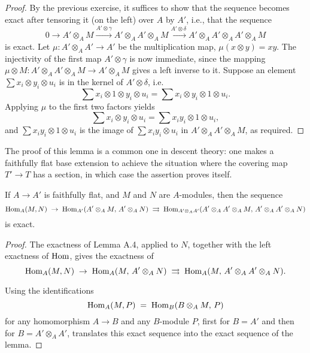 \documentclass[12pt]{article}
\begin{document}
\begin{proof}
    By the previous exercise, it suffices to show that the sequence becomes exact after tensoring it (on the left) over $A$ by $A'$, i.e., that the sequence
    \[
        0 \longrightarrow A' \otimes_A M \xrightarrow{A' \otimes \gamma} A' \otimes_A A' \otimes_A M \xrightarrow{A' \otimes \delta} A' \otimes_A A' \otimes_A A' \otimes_A M
    \]
    is exact. Let $\mu: A' \otimes_A A' \to A'$ be the multiplication map, $\mu(x \otimes y) = xy$. The injectivity of the first map $A' \otimes \gamma$ is now immediate, since the mapping $\mu \otimes M: A' \otimes_A A' \otimes_A M \to A' \otimes_A M$ gives a left inverse to it. Suppose an element $\sum x_i \otimes y_i \otimes u_i$ is in the kernel of $A' \otimes \delta$, i.e.
    \[
        \sum x_i \otimes 1 \otimes y_i \otimes u_i = \sum x_i \otimes y_i \otimes 1 \otimes u_i.
    \]
    Applying $\mu$ to the first two factors yields
    \[
        \sum x_i \otimes y_i \otimes u_i = \sum x_i y_i \otimes 1 \otimes u_i,
    \]
    and $\sum x_i y_i \otimes 1 \otimes u_i$ is the image of $\sum x_i y_i \otimes u_i$ in $A' \otimes_A A' \otimes_A M$, as required.
\end{proof}

\begin{remark}
    The proof of this lemma is a common one in descent theory: one makes a faithfully flat base extension to achieve the situation where the covering map \( T' \to T \) has a section, in which case the assertion proves itself.
\end{remark}

\begin{lemma}\label{lem:descent_hom}
If $A \to A'$ is faithfully flat, and $M$ and $N$ are $A$-modules, then the sequence
\[
\operatorname{Hom}_A(M,N) \;\to\; \operatorname{Hom}_{A'}(A' \otimes_A M,\, A' \otimes_A N) 
\;\rightrightarrows\; \operatorname{Hom}_{A' \otimes_A A'}(A' \otimes_A A' \otimes_A M,\, A' \otimes_A A' \otimes_A N)
\]
is exact.
\end{lemma}

\begin{proof}
The exactness of Lemma A.4, applied to $N$, together with the left exactness of $\operatorname{Hom}$, gives the exactness of
\[
\operatorname{Hom}_A(M,N) \;\to\; \operatorname{Hom}_A(M,\, A' \otimes_A N) 
\;\rightrightarrows\; \operatorname{Hom}_A(M,\, A' \otimes_A A' \otimes_A N).
\]

Using the identifications 
\[
\operatorname{Hom}_A(M,P) \;=\; \operatorname{Hom}_B(B \otimes_A M,\, P)
\]
for any homomorphism $A \to B$ and any $B$-module $P$, first for $B = A'$ and then for 
$B = A' \otimes_A A'$, translates this exact sequence into the exact sequence of the lemma.
\end{proof}
\end{document}
